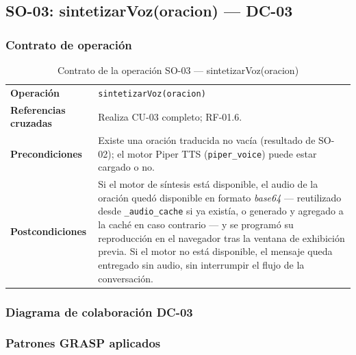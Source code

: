 \subsection{SO-03: sintetizarVoz(oracion) --- DC-03}

\subsubsection{Contrato de operación}

\begin{table}[H]
\centering
\begin{tabularx}{\textwidth}{@{}p{4.4cm} X@{}}
\toprule
\textbf{Operación} & \texttt{sintetizarVoz(oracion)} \\
\textbf{Referencias cruzadas} & Realiza CU-03 completo; RF-01.6. \\
\textbf{Precondiciones} & Existe una oración traducida no vacía
(resultado de SO-02); el motor Piper TTS (\texttt{piper\_voice}) puede estar
cargado o no. \\
\textbf{Postcondiciones} & Si el motor de síntesis está disponible, el audio
de la oración quedó disponible en formato \textit{base64} --- reutilizado
desde \texttt{\_audio\_cache} si ya existía, o generado y agregado a la
caché en caso contrario --- y se programó su reproducción en el navegador
tras la ventana de exhibición previa. Si el motor no está disponible, el
mensaje queda entregado sin audio, sin interrumpir el flujo de la
conversación. \\
\bottomrule
\end{tabularx}
\caption{Contrato de la operación SO-03 --- sintetizarVoz(oracion)}
\label{tab:col-contrato-so03}
\end{table}

\subsubsection{Diagrama de colaboración DC-03}


\subsubsection{Patrones GRASP aplicados}

